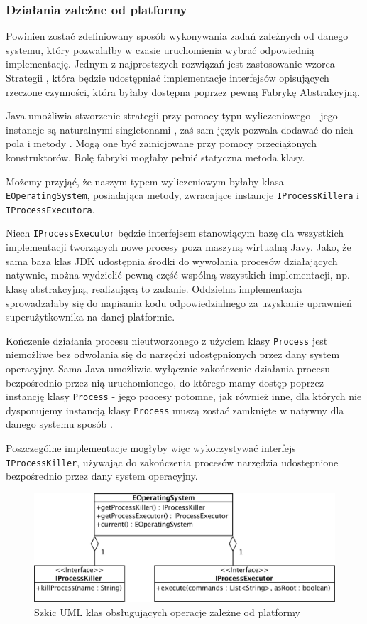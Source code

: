 \documentclass[polish,12pt,titlepage]{article}
\begin{document}
\subsubsection{Działania zależne od platformy}

Powinien zostać zdefiniowany sposób wykonywania zadań zależnych od danego
systemu, który pozwalałby w czasie uruchomienia wybrać odpowiednią
implementację. Jednym z najprostszych rozwiązań jest zastosowanie wzorca
Strategii \cite{STRATEGIA}, która będzie udostępniać implementacje 
interfejsów  opisujących rzeczone czynności, która byłaby dostępna poprzez 
pewną Fabrykę Abstrakcyjną.

Java umożliwia stworzenie strategii przy pomocy typu wyliczeniowego - jego
instancje są naturalnymi singletonami \cite{SINGLETON}, zaś sam język pozwala
dodawać do nich pola i metody \cite{DODAWANIE_METOD_ENUM}. Mogą one być
zainicjowane przy pomocy przeciążonych konstruktorów. Rolę fabryki mogłaby
pełnić statyczna metoda klasy.

Możemy przyjąć, że naszym typem wyliczeniowym byłaby klasa
\texttt{EOperatingSystem}, posiadająca metody, zwracające instancje
\texttt{IProcessKillera} i \texttt{IProcessExecutora}.

Niech \texttt{IProcessExecutor} będzie interfejsem stanowiącym bazę dla
wszystkich implementacji tworzących nowe procesy poza maszyną wirtualną Javy.
Jako, że sama baza klas JDK udostępnia środki do wywołania procesów
działających natywnie, można wydzielić pewną część wspólną wszystkich
implementacji, np. klasę abstrakcyjną, realizującą to zadanie. Oddzielna
implementacja sprowadzałaby się do napisania kodu odpowiedzialnego za
uzyskanie uprawnień superużytkownika na danej platformie.

Kończenie działania procesu nieutworzonego z użyciem klasy \texttt{Process}
jest niemożliwe bez odwołania się do narzędzi udostępnionych przez dany system
operacyjny. Sama Java umożliwia wyłącznie zakończenie działania procesu
bezpośrednio przez nią uruchomionego, do którego mamy dostęp poprzez instancję
klasy \texttt{Process} - jego procesy potomne, jak również inne, dla których
nie dysponujemy instancją klasy \texttt{Process} muszą zostać zamknięte w
natywny dla danego systemu sposób \cite{JAVA_TERMINACJA}.

Poszczególne implementacje mogłyby więc wykorzystywać interfejs
\texttt{IProcessKiller}, używając do zakończenia procesów narzędzia
udostępnione bezpośrednio przez dany system operacyjny.

\begin{figure}[!ht]
\centering
\includegraphics[bb=0 0 1253 453, scale=0.30]{OperatingSystem.png}
\caption{Szkic UML klas obsługujących operacje zależne od platformy}
\end{figure}
\end{document}
